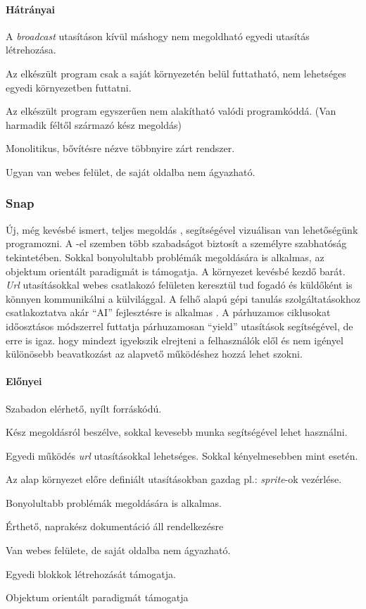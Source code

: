 \documentclass[12pt,a4paper,oneside]{report} %
\begin{document}
\paragraph{Hátrányai} 
\begin{compactitem}
	\item A \textit{broadcast} utasításon kívül máshogy nem megoldható egyedi utasítás létrehozása.
	\item Az elkészült program csak a saját környezetén belül futtatható, nem lehetséges egyedi környezetben futtatni.
	\item Az elkészült program egyszerűen nem alakítható valódi programkóddá. (Van harmadik féltől származó kész megoldás)
	\item Monolitikus, bővítésre nézve többnyire zárt rendszer.
	\item Ugyan van webes felület, de saját oldalba nem ágyazható.
\end{compactitem}

\subsubsection{Snap} \label{snap}Új, még kevésbé  ismert, teljes megoldás \cite{harvey2013snap}, segítségével vizuálisan van lehetőségünk programozni. A -el szemben több szabadságot biztosít a személyre szabhatóság tekintetében. Sokkal bonyolultabb problémák megoldására is alkalmas, az objektum orientált paradigmát is támogatja. A környezet kevésbé kezdő barát. \textit{Url} utasításokkal webes  csatlakozó felületen keresztül tud fogadó és küldőként is könnyen kommunikálni a külvilággal. A felhő alapú gépi tanulás szolgáltatásokhoz csatlakoztatva akár ``AI'' fejlesztésre is alkalmas \cite{kahn2018ai}. A párhuzamos ciklusokat időosztásos módszerrel futtatja párhuzamosan ``yield'' utasítások segítségével, de erre is igaz. hogy mindezt igyekszik elrejteni a felhasználók elől és nem igényel különösebb beavatkozást az alapvető működéshez hozzá lehet szokni.
\paragraph{Előnyei} 
\begin{compactitem}
	\item Szabadon elérhető, nyílt forráskódú.
	\item Kész megoldásról beszélve, sokkal kevesebb munka segítségével lehet használni.
	\item Egyedi működés \textit{url} utasításokkal lehetséges. Sokkal kényelmesebben mint  esetén.
	\item Az alap környezet előre definiált utasításokban gazdag pl.: \textit{sprite}-ok vezérlése.
	\item Bonyolultabb problémák megoldására is alkalmas.
	\item Érthető, naprakész dokumentáció áll rendelkezésre
	\item Van webes felülete, de saját oldalba nem ágyazható.
	\item Egyedi blokkok létrehozását támogatja.
	\item Objektum orientált paradigmát támogatja
\end{compactitem}
\end{document}
